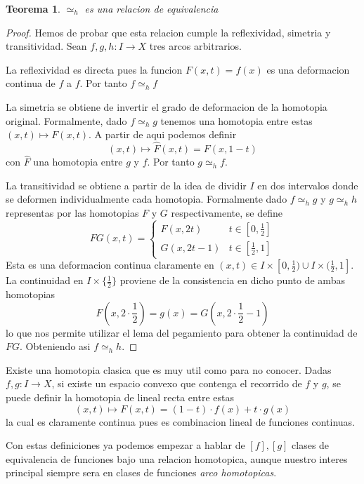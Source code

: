 \documentclass[letterpaper]{article}
\theoremstyle{definition}
\theoremstyle{plain}
\newtheorem{teorema}{Teorema}
\begin{document}
\begin{teorema}
  \(\simeq_h\) es una relacion de equivalencia
\end{teorema}
\begin{proof}
  Hemos de probar que esta relacion cumple la reflexividad, simetria y
  transitividad. Sean \(f,g,h : I \to X\) tres arcos arbitrarios.

  La reflexividad es directa pues la funcion \(F(x,t) = f(x)\) es una
  deformacion continua de \(f\) a \(f\). Por tanto \(f \simeq_h f\)

  La simetria se obtiene de invertir el grado de deformacion de la
  homotopia original. Formalmente, dado \(f \simeq_h g\) tenemos una
  homotopia entre estas \((x,t) \mapsto F(x,t)\). A partir de aqui
  podemos definir
  \[ (x,t) \mapsto \hat{F}(x,t) = F(x,1-t)\]
  con \(\hat{F}\) una homotopia entre \(g\) y \(f\). Por tanto \(g
  \simeq_h f\).

  La transitividad se obtiene a partir de la idea de dividir \(I\) en dos
  intervalos donde se deformen individualmente cada homotopia.
  Formalmente dado \(f \simeq_h g\) y \(g \simeq_h h\) representas por
  las homotopias \(F\) y \(G\) respectivamente, se define
  \[ FG(x,t) = \begin{cases}
                 F(x,2t) & t \in [0,\frac{1}{2}] \\
                 G(x,2t - 1) & t \in [ \frac{1}{2} , 1]
               \end{cases}
  \]
  Esta es una deformacion continua claramente en \((x,t) \in I \times [0,
  \frac{1}{2}) \cup I \times (\frac{1}{2}, 1]\). La continuidad en \(I
  \times \{\frac{1}{2}\}\) proviene de la consistencia en dicho punto de
  ambas homotopias
  \[ F(x,2 \cdot \frac{1}{2}) = g(x) = G(x, 2 \cdot \frac{1}{2} - 1)\]
  lo que nos permite utilizar el lema del pegamiento para obtener la
  continuidad de \(FG\). Obteniendo asi \(f \simeq_h h\).
\end{proof}

Existe una homotopia clasica que es muy util como para no conocer. Dadas
\(f,g : I \to X\), si existe un espacio convexo que contenga el recorrido
de \(f\) y \(g\), se puede definir la homotopia de lineal recta entre
estas
\[ (x,t) \mapsto F(x,t) = (1-t) \cdot f(x) + t \cdot g(x) \]
la cual es claramente continua pues es combinacion lineal de funciones continuas.

Con estas definiciones ya podemos empezar a hablar de \([f],[g]\) clases
de equivalencia de funciones bajo una relacion homotopica, aunque nuestro
interes principal siempre sera en clases de funciones \emph{arco
homotopicas}.
\end{document}
